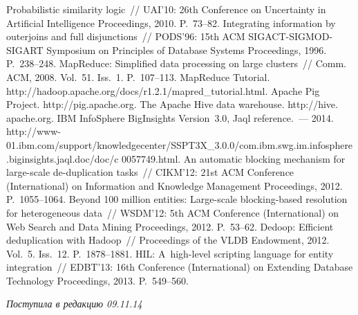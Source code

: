\begin{multicols}{2}
{{\begin{thebibliography}{99}
 Probabilistic similarity logic~// UAI'10:  26th Conference on
Uncertainty in Artificial Intelligence Proceedings, 2010. P.~73--82.
 Integrating information by outerjoins and full disjunctions~//
PODS'96: 15th ACM SIGACT-SIGMOD-SIGART Symposium on Principles of Database
Systems Proceedings, 1996. P.~238--248.
 MapReduce: Simplified data processing on large clusters~//
Comm. ACM, 2008. Vol.~51. Iss.~1. P.~107--113.
MapReduce Tutorial. {\sf http://hadoop.apache.org/docs/\linebreak r1.2.1/mapred\_tutorial.html}.
Apache Pig Project. {\sf http://pig.apache.org}.
The Apache Hive data warehouse. {\sf http://hive. apache.org}.
IBM InfoSphere BigInsights Version~3.0, Jaql reference.~--- 2014.
{\sf
http://www-01.ibm.com/support/\linebreak knowledgecenter/SSPT3X\_3.0.0/com.ibm.swg.im.\linebreak infosphere.biginsights.jaql.doc/doc/c
0057749.html}.
 An automatic blocking
mechanism for large-scale de-duplication tasks~// CIKM'12:  21st ACM Conference
(International) on Information and Knowledge Management Proceedings, 2012. P.~1055--1064.
 Beyond
100 million entities: Large-scale blocking-based resolution for heterogeneous data~//
\mbox{WSDM'12}:
5th ACM Conference (International) on Web Search and Data Mining Proceedings, 2012.
P.~53--62.
 Dedoop: Efficient deduplication with Hadoop~// Proceedings of
the VLDB Endowment, 2012. Vol.~5. Iss.~12. P.~1878--1881.
HIL: A~high-level scripting language for entity integration~// EDBT'13: 16th Conference
(International) on Extending Database Technology Proceedings, 2013. P.~549--560.
 \end{thebibliography}

 }
 }

\end{multicols}

\vspace*{-6pt}

\hfill{\small\textit{Поступила в редакцию 09.11.14}}

